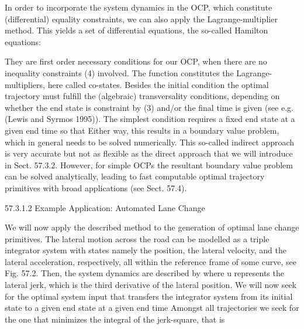 In order to incorporate the system dynamics in the OCP, which constitute (differential) equality constraints, we can also apply the Lagrange-multiplier method. This yields a set of differential equations, the so-called Hamilton equations:


They are first order necessary conditions for our OCP, when there are no inequality constraints (4) involved. The function 
constitutes the Lagrange-multipliers, here called co-states. Besides the initial condition
the optimal trajectory must fulfill the (algebraic) transversality conditions, depending on whether the end state 
is constraint by (3) and/or the final time 
is given (see e.g. (Lewis and Syrmos 1995)). The simplest condition requires a fixed end state 
at a given end time 
so that
Either way, this results in a boundary value problem, which in general needs to be solved numerically. This so-called indirect approach is very accurate but not as flexible as the direct approach that we will introduce in Sect. 57.3.2. However, for simple OCPs the resultant boundary value problem can be solved analytically, leading to fast computable optimal trajectory primitives with broad applications (see Sect. 57.4).

57.3.1.2	Example Application: Automated Lane Change

We will now apply the described method to the generation of optimal lane change primitives. The lateral motion across the road can be modelled as a triple integrator system with states 
namely the position, the lateral velocity, and the lateral acceleration, respectively, all within the reference frame of some curve, see Fig. 57.2.
Then, the system dynamics are described by 
where u represents the lateral jerk, which is the third derivative of the lateral position. We will now seek for the optimal system input %
that transfers the integrator system from its initial state
 to a given end state 
at a given end time 
Amongst all trajectories we seek for the one that minimizes the integral of the jerk-square, that is

